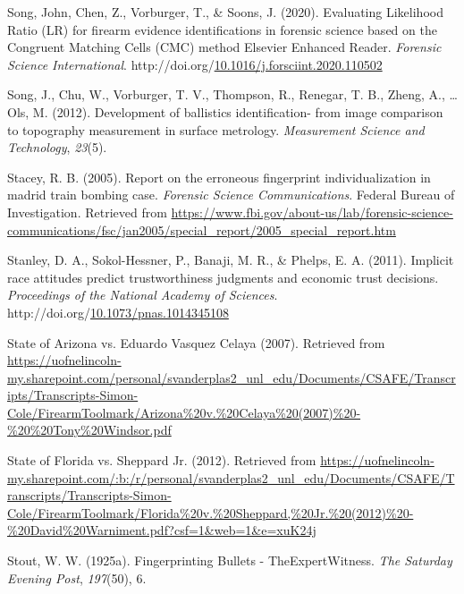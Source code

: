 \documentclass[print]{nuthesis}
\newlength{\cslhangindent}
\newenvironment{CSLReferences}[2]%
{\setlength{\parindent}{0pt}%
\everypar{\setlength{\hangindent}{\cslhangindent}}\ignorespaces}%
{\par}
\begin{document}
\begin{CSLReferences}{1}{0}
\leavevmode{}%
Song, John, Chen, Z., Vorburger, T., \& Soons, J. (2020). Evaluating {Likelihood} {Ratio} ({LR}) for firearm evidence identifications in forensic science based on the {Congruent} {Matching} {Cells} ({CMC}) method {\textbar} {Elsevier} {Enhanced} {Reader}. \emph{Forensic Science International}. http://doi.org/\href{https://doi.org/10.1016/j.forsciint.2020.110502}{10.1016/j.forsciint.2020.110502}

\leavevmode{}%
Song, J., Chu, W., Vorburger, T. V., Thompson, R., Renegar, T. B., Zheng, A., \ldots{} Ols, M. (2012). Development of ballistics identification- from image comparison to topography measurement in surface metrology. \emph{Measurement Science and Technology}, \emph{23}(5).

\leavevmode{}%
Stacey, R. B. (2005). Report on the erroneous fingerprint individualization in madrid train bombing case. \emph{Forensic Science Communications}. {Federal Bureau of Investigation}. Retrieved from \url{https://www.fbi.gov/about-us/lab/forensic-science-communications/fsc/jan2005/special_report/2005_special_report.htm}

\leavevmode{}%
Stanley, D. A., Sokol-Hessner, P., Banaji, M. R., \& Phelps, E. A. (2011). Implicit race attitudes predict trustworthiness judgments and economic trust decisions. \emph{Proceedings of the National Academy of Sciences}. http://doi.org/\href{https://doi.org/10.1073/pnas.1014345108}{10.1073/pnas.1014345108}

\leavevmode{}%
State of {Arizona} vs. Eduardo {Vasquez} {Celaya} (2007). Retrieved from \url{https://uofnelincoln-my.sharepoint.com/personal/svanderplas2_unl_edu/Documents/CSAFE/Transcripts/Transcripts-Simon-Cole/FirearmToolmark/Arizona\%20v.\%20Celaya\%20(2007)\%20-\%20\%20Tony\%20Windsor.pdf}

\leavevmode{}%
State of {Florida} vs. Sheppard {Jr.} (2012). Retrieved from \url{https://uofnelincoln-my.sharepoint.com/:b:/r/personal/svanderplas2_unl_edu/Documents/CSAFE/Transcripts/Transcripts-Simon-Cole/FirearmToolmark/Florida\%20v.\%20Sheppard,\%20Jr.\%20(2012)\%20-\%20David\%20Warniment.pdf?csf=1\&web=1\&e=xuK24j}

\leavevmode{}%
Stout, W. W. (1925a). {Fingerprinting} {Bullets} - {The}{Expert}{Witness}. \emph{The {Saturday} {Evening} {Post}}, \emph{197}(50), 6.


\end{CSLReferences}
\end{document}
